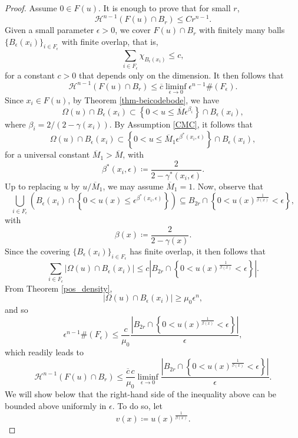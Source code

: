 \documentclass[10pt,a4paper]{amsart}
\begin{document}
\begin{proof}
Assume $0 \in F(u)$. It is enough to prove that for small $r$,
$$
\mathcal{H}^{n-1}(F(u) \cap B_{r}) \leq Cr^{n-1}.
$$
Given a small parameter $\epsilon>0$, we cover $F(u) \cap B_r$ with finitely many balls $\{B_\epsilon(x_i) \}_{i \in F_\epsilon}$ with finite overlap, that is,
$$
    \sum_{i \in F_\epsilon} \chi_{B_\epsilon(x_i)} \leq c,
$$
for a constant $c>0$ that depends only on the dimension. It then follows that
\begin{equation}\nonumber
    \mathcal{H}^{n-1}(F(u)\cap B_r) \leq \overline{c} \liminf_{\epsilon \rightarrow 0} \epsilon^{n-1} \#(F_\epsilon).
\end{equation}
Since $x_i \in F(u)$, by Theorem \ref{thm-beicodebode}, we have
$$
    \Omega(u) \cap B_\epsilon(x_i) \subset \left\{0 < u \leq \overline{M}\epsilon^{\beta_i} \right\} \cap B_\epsilon(x_i),
$$
where $\beta_i = 2/(2-\gamma(x_i))$. By Assumption \eqref{CMC}, it follows that
$$
    \Omega(u) \cap B_\epsilon(x_i) \subset \left\{0 < u \leq \overline{M}_1\epsilon^{\beta^\ast(x_i,\epsilon)} \right\} \cap B_\epsilon(x_i),
$$
for a universal constant $\overline{M}_1 > \overline{M}$, with
$$
	\beta^\ast(x_i,\epsilon) \coloneqq \frac{2}{2-\gamma^\ast(x_i,\epsilon)}.
$$
Up to replacing $u$ by $u/\overline{M}_1$, we may assume $\overline{M}_1 = 1$. Now, observe that
$$
    \bigcup_{i 
    \in F_\epsilon} \left(B_\epsilon(x_i) \cap \left\{ 0 < u(x) \leq \epsilon^{\beta^\ast(x_i,\epsilon)} \right\} \right) \subseteq B_{2r} \cap \left\{0 < u(x)^{\frac{1}{\beta(x)}} < \epsilon \right\},
$$
with
$$
	\beta(x) \coloneqq \frac{2}{2-\gamma(x)}.
$$
Since the covering $\{B_\epsilon(x_i) \}_{i \in F_\epsilon}$ has finite overlap, it then follows that
$$
    \sum_{i \in F_\epsilon} \left| \Omega(u) \cap B_\epsilon(x_i) \right| \leq c \left| B_{2r} \cap \left\{0 < u(x)^{\frac{1}{\beta(x)}} < \epsilon \right\}\right|.
$$
From Theorem \ref{pos_density},
$$
    |\Omega(u) \cap B_\epsilon(x_i)| \geq \mu_0 \epsilon^n,
$$
and so
$$
     \epsilon^{n-1} \#(F_\epsilon) \leq \frac{c}{\mu_0} \frac{\left|B_{2r} \cap \left\{0 < u(x)^{\frac{1}{\beta(x)}} < \epsilon \right\}\right|}{\epsilon},
$$
which readily leads to
$$
    \mathcal{H}^{n-1}(F(u) \cap B_r) \leq \frac{\overline{c}\, c}{\mu_0} \liminf_{\epsilon \rightarrow 0} \frac{\left|B_{2r} \cap \left\{0 < u(x)^{\frac{1}{\beta(x)}} < \epsilon \right\}\right|}{\epsilon}.
$$
We will show below that the right-hand side of the inequality above can be bounded above uniformly in $\epsilon$. To do so, let 
$$
    v(x) \coloneqq u(x)^{\frac{1}{\beta(x)}}.
$$
\end{proof}
\end{document}
